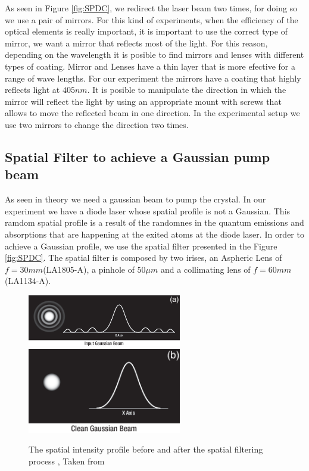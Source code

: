 As seen in Figure \ref{fig:SPDC}, we redirect the laser beam two times, for doing
so we use a pair of mirrors. For this kind of experiments, when the efficiency 
of the optical elements is really important, it is important to use the correct type
of mirror, we want a mirror that reflects most of the light. For this reason, depending
on the wavelength it is posible to find mirrors and lenses with different types of 
coating. Mirror and Lenses have a thin layer that is more efective for a range 
of wave lengths. For our experiment the mirrors have a coating that highly reflects light at
$405nm$. It is posible to manipulate the direction in which the mirror will reflect the 
light by using an appropriate mount with screws that allows to move the reflected beam in one
direction. In the experimental setup we use two mirrors to change the direction two times.



\subsection{Spatial Filter to achieve a Gaussian pump beam}
As seen in theory we need a gaussian beam to pump the crystal. In our experiment we have a 
diode laser whose spatial profile is not a Gaussian. This ramdom spatial profile is a result of the randomnes in the quantum emissions and 
absorptions that are happening at the exited atoms at the diode laser\cite{hecht}.
In order to achieve a Gaussian profile, we use the spatial filter presented in the 
Figure \ref{fig:SPDC}. The spatial filter is composed by two irises, an Aspheric Lens of $f=30 mm$(LA1805-A), a pinhole of $50 \mu m$ and a 
collimating lens of $f=60 mm$(LA1134-A).
\begin{figure}[h!]
\centering
{  \includegraphics[width=0.6\textwidth]{Figures/inputBeam.png} }
{  \includegraphics[width=0.6\textwidth]{Figures/outputBeam.png} }
\caption{The spatial intensity profile before and after the spatial filtering process , Taken from \cite{thorlabs}}
 \label{fig:inputOutputBeam}
\end{figure}

